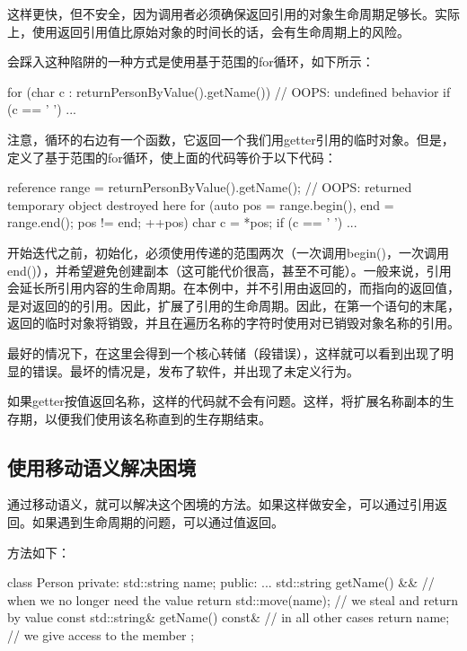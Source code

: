 这样更快，但不安全，因为调用者必须确保返回引用的对象生命周期足够长。实际上，使用返回引用值比原始对象的时间长的话，会有生命周期上的风险。

会踩入这种陷阱的一种方式是使用基于范围的for循环，如下所示：

\begin{cppcode}
for (char c : returnPersonByValue().getName()) { // OOPS: undefined behavior
	if (c == ' ') {
		...
	}
}
\end{cppcode}

注意，循环的右边有一个函数，它返回一个我们用getter引用的临时对象。但是，定义了基于范围的for循环，使上面的代码等价于以下代码：

\begin{cppcode}
reference range = returnPersonByValue().getName();
// OOPS: returned temporary object destroyed here
for (auto pos = range.begin(), end = range.end(); pos != end; ++pos) {
	char c = *pos;
	if (c == ' ') {
		...
	}
}
\end{cppcode}

开始迭代之前，初始化，必须使用传递的范围两次（一次调用begin()，一次调用end()），并希望避免创建副本（这可能代价很高，甚至不可能）。一般来说，引用会延长所引用内容的生命周期。在本例中，并不引用由返回的，而指向的返回值，是对返回的的引用。因此，扩展了引用的生命周期。因此，在第一个语句的末尾，返回的临时对象将销毁，并且在遍历名称的字符时使用对已销毁对象名称的引用。

最好的情况下，在这里会得到一个核心转储（段错误），这样就可以看到出现了明显的错误。最坏的情况是，发布了软件，并出现了未定义行为。

如果getter按值返回名称，这样的代码就不会有问题。这样，将扩展名称副本的生存期，以便我们使用该名称直到的生存期结束。

\subsection{使用移动语义解决困境}

通过移动语义，就可以解决这个困境的方法。如果这样做安全，可以通过引用返回。如果遇到生命周期的问题，可以通过值返回。

方法如下：

\begin{cppcode}
class Person
{
private:
	std::string name;
public:
	...
	std::string getName() && { // when we no longer need the value
		return std::move(name); // we steal and return by value
	}
	const std::string& getName() const& { // in all other cases
		return name; // we give access to the member
	}
};
\end{cppcode}

